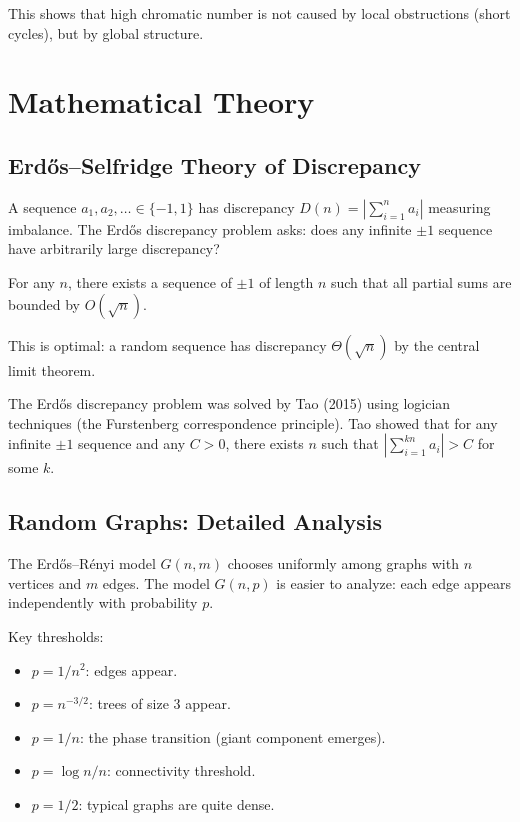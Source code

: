 This shows that high chromatic number is not caused by local obstructions (short cycles), but by global structure.

\section{Mathematical Theory}

\subsection{Erd\H{o}s--Selfridge Theory of Discrepancy}

A sequence $a_1, a_2, \ldots \in \{-1, 1\}$ has discrepancy $D(n) = |\sum_{i=1}^n a_i|$ measuring imbalance. The Erd\H{o}s discrepancy problem asks: does any infinite $\pm 1$ sequence have arbitrarily large discrepancy?

\begin{theorem}
For any $n$, there exists a sequence of $\pm 1$ of length $n$ such that all partial sums are bounded by $O(\sqrt{n})$.
\end{theorem}

This is optimal: a random sequence has discrepancy $\Theta(\sqrt{n})$ by the central limit theorem.

The Erd\H{o}s discrepancy problem was solved by Tao (2015) using logician techniques (the Furstenberg correspondence principle). Tao showed that for any infinite $\pm 1$ sequence and any $C > 0$, there exists $n$ such that $|\sum_{i=1}^{kn} a_i| > C$ for some $k$.

\subsection{Random Graphs: Detailed Analysis}

The Erd\H{o}s--R\'{e}nyi model $G(n,m)$ chooses uniformly among graphs with $n$ vertices and $m$ edges. The model $G(n,p)$ is easier to analyze: each edge appears independently with probability $p$.

Key thresholds:
\begin{itemize}
    \item $p = 1/n^2$: edges appear.
    \item $p = n^{-3/2}$: trees of size 3 appear.
    \item $p = 1/n$: the phase transition (giant component emerges).
    \item $p = \log n/n$: connectivity threshold.
    \item $p = 1/2$: typical graphs are quite dense.
\end{itemize}

